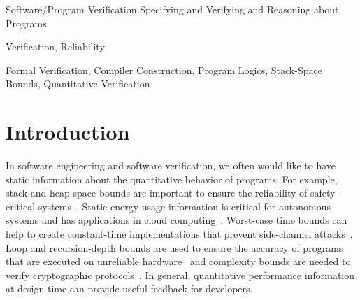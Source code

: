 \documentclass[nocopyrightspace,preprint]{sigplanconf}
\begin{document}
{Software/Program Verification}
{Specifying and Verifying and Reasoning about Programs}

\terms Verification, Reliability


\keywords Formal Verification, Compiler Construction, Program Logics,
Stack-Space Bounds, Quantitative Verification

\section{Introduction}
\label{sec:intro}

In software engineering and software verification, we often would like
to have static information about the quantitative behavior of
programs.  For example, stack and heap-space bounds are important to
ensure the reliability of safety-critical systems~\cite{veristack14,Regehr05}.
Static energy usage information is critical for autonomous systems and
has applications in cloud computing~\cite{CohenZSL12,CarrollH10}.
Worst-case time bounds can help to create constant-time
implementations that prevent side-channel
attacks~\cite{KasperS09,BartheBCLP14}.  Loop and recursion-depth
bounds are used to ensure the accuracy of programs that are executed
on unreliable hardware~\cite{CarbinMR13} and complexity bounds are
needed to verify cryptographic protocols~\cite{BartheGB09}.
%
In general, quantitative performance information at design time can
provide useful feedback for developers.
\end{document}
